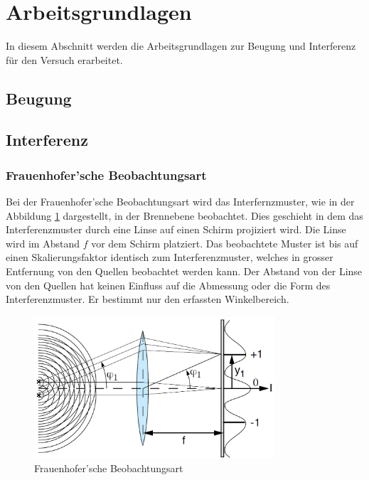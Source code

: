 \section{Arbeitsgrundlagen}
In diesem Abschnitt werden die Arbeitsgrundlagen zur Beugung und Interferenz für den Versuch erarbeitet.
\subsection{Beugung}


\subsection{Interferenz}

\subsubsection{Frauenhofer'sche Beobachtungsart}
Bei der Frauenhofer'sche Beobachtungsart wird das Interfernzmuster, wie in der Abbildung \ref{fig:beobachtungsart} dargestellt, in der Brennebene beobachtet. Dies geschieht in dem das Interferenzmuster durch eine Linse auf einen Schirm projiziert wird. Die Linse wird im Abstand $ f $ vor dem Schirm platziert. Das beobachtete Muster ist bis auf einen Skalierungsfaktor identisch zum Interferenzmuster, welches in grosser Entfernung von den Quellen beobachtet werden kann. Der Abstand von der Linse von den Quellen hat keinen Einfluss auf die Abmessung oder die Form des Interferenzmuster. Er bestimmt nur den erfassten Winkelbereich.

\begin{figure}[h!]
	\centering
	\includegraphics[width=0.8\textwidth]{data/fraunhofer}
	\caption{Frauenhofer'sche Beobachtungsart}
	\label{fig:beobachtungsart}
\end{figure}

